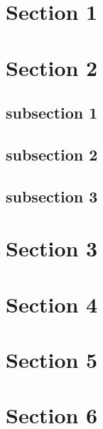 \documentclass{beamer}
\begin{document}
\begin{frame}
\tableofcontents
\end{frame}

\begin{frame}
\tableofcontents[sections=2]
\end{frame}

\section{Section 1}\frame{}

\section{Section 2}\frame{}
\begin{frame}
\tableofcontents[currentsection,sectionstyle=show/hide]
\end{frame}

\subsection{subsection 1}\frame{}
\subsection{subsection 2}\frame{}
\subsection{subsection 3}\frame{}
\section{Section 3}\frame{}
\section{Section 4}\frame{}
\section{Section 5}\frame{}
\section{Section 6}\frame{}
\end{document}

